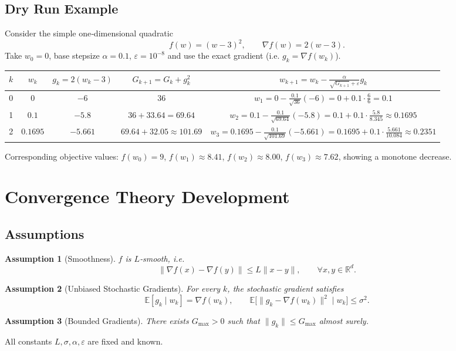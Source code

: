 \documentclass{article}
\newtheorem{assumption}{Assumption}
\newcommand{\E}{\mathbb{E}}
\newcommand{\R}{\mathbb{R}}
\begin{document}
\subsection*{Dry Run Example}
Consider the simple one‑dimensional quadratic 
\[
f(w)=(w-3)^{2},\qquad \nabla f(w)=2(w-3).
\]
Take $w_{0}=0$, base stepsize $\alpha=0.1$, $\varepsilon=10^{-8}$ and use the
exact gradient (i.e. $g_{k}=\nabla f(w_{k})$).  

\begin{center}
\begin{tabular}{c|c|c|c|c}
$k$ & $w_{k}$ & $g_{k}=2(w_{k}-3)$ & $G_{k+1}=G_{k}+g_{k}^{2}$ & $w_{k+1}=w_{k}-\frac{\alpha}{\sqrt{G_{k+1}}+\varepsilon}g_{k}$\\ \hline
0 & $0$ & $-6$ & $36$ & $w_{1}=0-\frac{0.1}{\sqrt{36}}(-6)=0+0.1\cdot\frac{6}{6}=0.1$\\[4pt]
1 & $0.1$ & $-5.8$ & $36+33.64=69.64$ & $w_{2}=0.1-\frac{0.1}{\sqrt{69.64}}(-5.8)
      =0.1+0.1\cdot\frac{5.8}{8.345}\approx0.1695$\\[4pt]
2 & $0.1695$ & $-5.661$ & $69.64+32.05\approx101.69$ &
 $w_{3}=0.1695-\frac{0.1}{\sqrt{101.69}}(-5.661)
      =0.1695+0.1\cdot\frac{5.661}{10.084}\approx0.2351$\\
\end{tabular}
\end{center}
Corresponding objective values: $f(w_{0})=9$, $f(w_{1})\approx8.41$,
$f(w_{2})\approx8.00$, $f(w_{3})\approx7.62$, showing a monotone decrease.

\section*{Convergence Theory Development}

\subsection*{Assumptions}
\begin{assumption}[Smoothness]\label{as:smooth}
$f$ is $L$‑smooth, i.e.
\[
\|\nabla f(x)-\nabla f(y)\|\le L\|x-y\|,\qquad\forall x,y\in\R^{d}.
\] 
\end{assumption}
\begin{assumption}[Unbiased Stochastic Gradients]\label{as:unbiased}
For every $k$, the stochastic gradient satisfies
\[
\E[g_{k}\mid w_{k}] = \nabla f(w_{k}), \qquad 
\E\!\bigl[\|g_{k}-\nabla f(w_{k})\|^{2}\mid w_{k}\bigr]\le\sigma^{2}.
\] 
\end{assumption}
\begin{assumption}[Bounded Gradients]\label{as:bounded}
There exists $G_{\max}>0$ such that $\|g_{k}\|\le G_{\max}$ almost surely.
\end{assumption}
All constants $L,\sigma,\alpha,\varepsilon$ are fixed and known.
\end{document}
